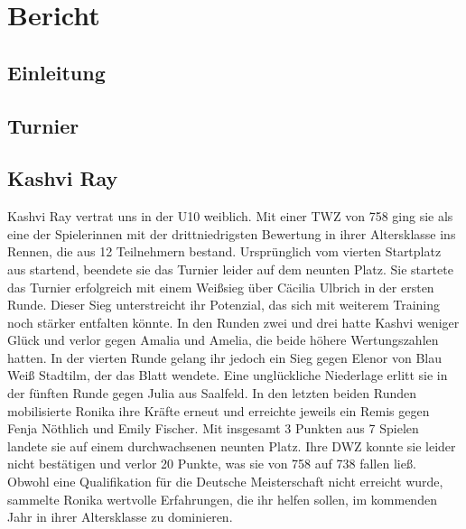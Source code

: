 \documentclass[a4paper,ngerman]{tui-algo-seminar}
\title{\inhalt}
\author{Erik Skopp}
\newcommand{\inhalt}{Thüringer Jugend Einzelmeisterschaft 2024}
\begin{document}
\maketitle
\thispagestyle{plain}
\begin{abstract}
    Bericht: \inhalt.\\
    Vom 4. bis zum 7. April fand in Naumburg (Sachsen-Anhalt) die diesjährige Thüringer Jugend-Einzelmeisterschaft im Schach statt. In jeder Altersklasse wurden sieben Runden nach dem Schweizer System ausgetragen. Die Gewinner qualifizieren sich für die Deutsche Einzelmeisterschaft in Willingen.
\end{abstract}

\tableofcontents 

\clearpage

\section{Bericht}


\subsection{Einleitung}

\subsection{Turnier}




\subsection{Kashvi Ray}
Kashvi Ray vertrat uns in der U10 weiblich. Mit einer TWZ von 758 ging sie als eine der Spielerinnen mit der drittniedrigsten Bewertung in ihrer Altersklasse ins Rennen, die aus 12 Teilnehmern bestand. Ursprünglich vom vierten Startplatz aus startend, beendete sie das Turnier leider auf dem neunten Platz. Sie startete das Turnier erfolgreich mit einem Weißsieg über Cäcilia Ulbrich in der ersten Runde. Dieser Sieg unterstreicht ihr Potenzial, das sich mit weiterem Training noch stärker entfalten könnte. In den Runden zwei und drei hatte Kashvi weniger Glück und verlor gegen Amalia und Amelia, die beide höhere Wertungszahlen hatten. In der vierten Runde gelang ihr jedoch ein Sieg gegen Elenor von Blau Weiß Stadtilm, der das Blatt wendete. Eine unglückliche Niederlage erlitt sie in der fünften Runde gegen Julia aus Saalfeld. In den letzten beiden Runden mobilisierte Ronika ihre Kräfte erneut und erreichte jeweils ein Remis gegen Fenja Nöthlich und Emily Fischer. Mit insgesamt 3 Punkten aus 7 Spielen landete sie auf einem durchwachsenen neunten Platz. Ihre DWZ konnte sie leider nicht bestätigen und verlor 20 Punkte, was sie von 758 auf 738 fallen ließ. Obwohl eine Qualifikation für die Deutsche Meisterschaft nicht erreicht wurde, sammelte Ronika wertvolle Erfahrungen, die ihr helfen sollen, im kommenden Jahr in ihrer Altersklasse zu dominieren.
\end{document}
